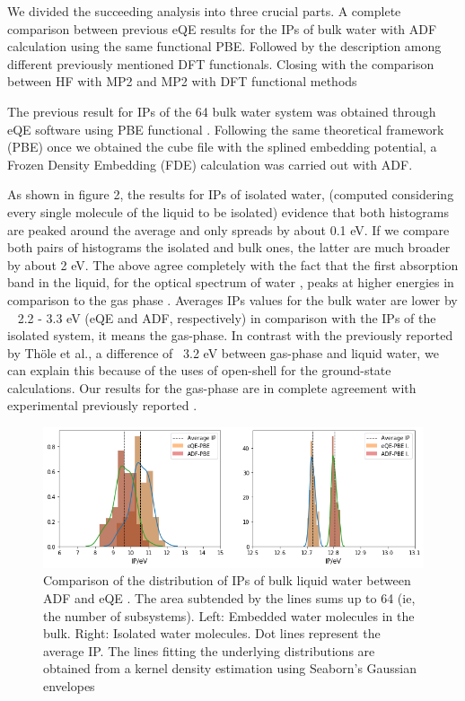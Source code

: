 \documentclass[12pt,a4paper]{article}
\begin{document}
We divided the succeeding analysis into three crucial parts. A complete comparison between previous eQE results for the
IPs of bulk water with ADF calculation using the same functional PBE. Followed by the description among different previously 
mentioned DFT functionals. Closing with the comparison between HF with MP2 and MP2 with DFT functional methods

The previous result for IPs of the 64 bulk water system was obtained through eQE software using PBE functional \cite{tolle2019charged}. Following
the same theoretical framework (PBE) once we obtained the cube file with the splined embedding potential, a Frozen Density 
Embedding (FDE) calculation was carried out with ADF. 

As shown in figure 2, the results for IPs of isolated water, (computed considering every single
molecule of the liquid to be isolated) evidence that both histograms are peaked around the average
and only spreads by about 0.1 eV. If we compare both pairs of histograms the isolated and bulk ones,
the latter are much broader by about 2 eV. The above agree completely with the fact that the first
absorption band in the liquid, for the optical spectrum of water \cite{blase2016erratum,genova2017cooperation,hermann2008resolving,hahn2005optical},
peaks at higher energies in comparison to the gas phase \cite{tolle2019charged}. Averages IPs values for the bulk water are lower by ~ 2.2 - 3.3 eV
(eQE and ADF, respectively) in comparison with the IPs of the isolated system, it means the gas-phase.  
In contrast with the previously reported by Th{\"o}le et al.\cite{tolle2019charged}, a difference of ~3.2 eV between 
gas-phase and liquid water, we can explain this because of the uses of open-shell
for the ground-state calculations. Our results for the gas-phase are in complete agreement 
with experimental previously reported \cite{nist2015nist}.  


\begin{figure}[!ht]
        \centering
        \includegraphics[width=\linewidth]{eQE-ADF}
	\caption{Comparison of the distribution of IPs of bulk liquid water between ADF\cite{te2001chemistry} and eQE \cite{genova2017eqe}. The area subtended by the lines sums up to 64 (ie, the number of subsystems). Left: Embedded water molecules in the bulk. Right: Isolated water molecules. Dot lines represent the average IP. The lines fitting the underlying distributions are obtained from a kernel density estimation using Seaborn's Gaussian envelopes\cite{waskom2017c}}
\end{figure}
\end{document}

